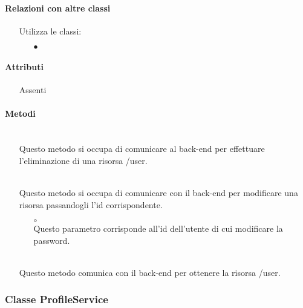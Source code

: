 \paragraph*{Relazioni con altre classi}
\begin{itemize}


\item[] Utilizza le classi:
\begin{itemize}
\item[$\bullet$] 
\end{itemize}
\end{itemize}

\paragraph*{Attributi}
\begin{itemize}
\item[] Assenti
\end{itemize}

\paragraph*{Metodi}
\begin{itemize}
\item[]  \\ Questo metodo si occupa di comunicare al back-end per effettuare l'eliminazione di una risorsa /user.
\item[]  \\ Questo metodo si occupa di comunicare con il back-end per modificare una risorsa passandogli l'id corrispondente.
\begin{itemize}\addtolength{\itemsep}{-0.5\baselineskip}
\item[$\circ$]  \\ Questo parametro corrisponde all'id dell'utente di cui modificare la password.
\end{itemize}
\item[]  \\ Questo metodo comunica con il back-end per ottenere la risorsa /user. 
\end{itemize}

\subsubsection{Classe ProfileService}

